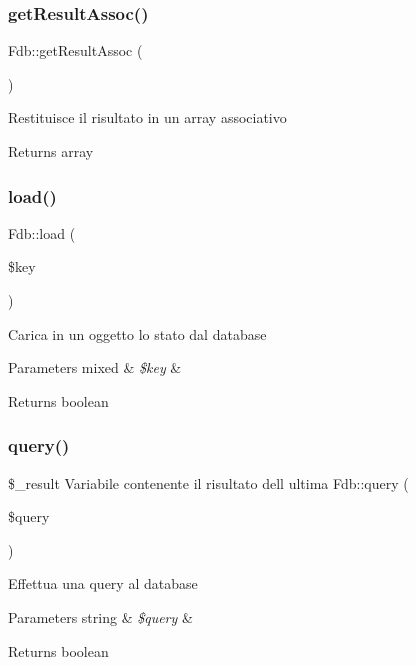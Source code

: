\subsubsection{\texorpdfstring{get\+Result\+Assoc()}{getResultAssoc()}}
{\footnotesize\ttfamily Fdb\+::get\+Result\+Assoc (\begin{DoxyParamCaption}{ }\end{DoxyParamCaption})}

Restituisce il risultato in un array associativo

\begin{DoxyReturn}{Returns}
array 
\end{DoxyReturn}
\mbox{\label{class_fdb_ace44253c7a593943b41037f5b87ea304}} 
\subsubsection{\texorpdfstring{load()}{load()}}
{\footnotesize\ttfamily Fdb\+::load (\begin{DoxyParamCaption}\item[{}]{\$key }\end{DoxyParamCaption})}

Carica in un oggetto lo stato dal database


\begin{DoxyParams}[1]{Parameters}
mixed & {\em \$key} & \\
\hline
\end{DoxyParams}
\begin{DoxyReturn}{Returns}
boolean 
\end{DoxyReturn}
\mbox{\label{class_fdb_a088aea7a8a3eb0b8c0847f9c148ba0ea}} 
\subsubsection{\texorpdfstring{query()}{query()}}
{\footnotesize\ttfamily \$\+\_\+result Variabile contenente il risultato dell ultima Fdb\+::query (\begin{DoxyParamCaption}\item[{}]{\$query }\end{DoxyParamCaption})}

Effettua una query al database 
\begin{DoxyParams}[1]{Parameters}
string & {\em \$query} & \\
\hline
\end{DoxyParams}
\begin{DoxyReturn}{Returns}
boolean 
\end{DoxyReturn}
\mbox{\label{class_fdb_af388fb9f8c07e9084b963a8c2f0b6ef4}} 
